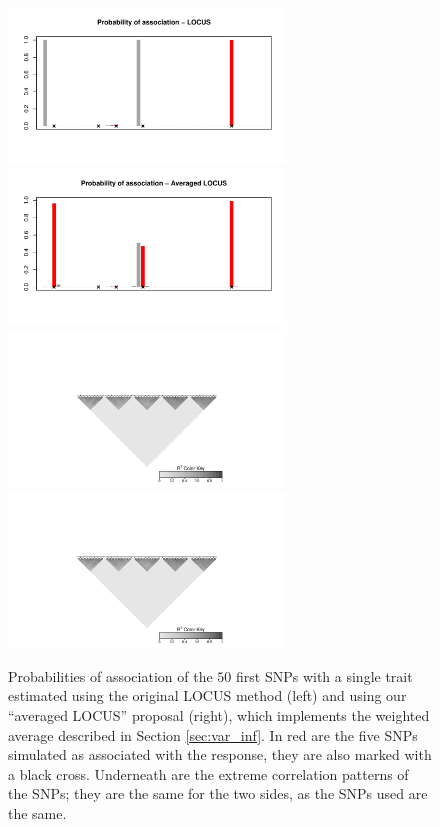 \documentclass[a4paper, 11pt]{report}
\numberwithin{equation}{chapter}
\begin{document}
\begin{figure}[h]
\centering
\includegraphics[width=2.9in, bb= 0 0 8in 4in]{images/proba_single.pdf}
\includegraphics[width=2.9in, bb= 0 0 8in 4in]{images/proba_averaged.pdf}
\includegraphics[width=2.9in, bb= 1.32in 0 6.4in 2in]{images/LD_plot.pdf}
\includegraphics[width=2.9in, bb= 1.32in 0 6.4in 2in]{images/LD_plot.pdf}
\caption{\label{fig:simple_locus}Probabilities of association of the $50$ first SNPs with a single trait estimated using the original LOCUS method (left) and using our ``averaged LOCUS'' proposal (right), which implements the weighted average described in Section \ref{sec:var_inf}. In red are the five SNPs simulated as associated with the response, they are also marked with a black cross. Underneath are the extreme correlation patterns of the SNPs; they are the same for the two sides, as the SNPs used are the same.}
\end{figure}
\end{document}
